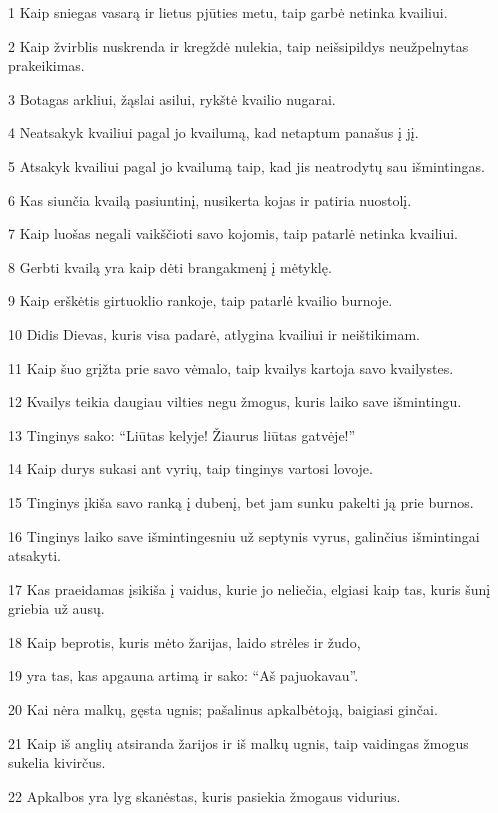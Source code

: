 \par 1 Kaip sniegas vasarą ir lietus pjūties metu, taip garbė netinka kvailiui. 
\par 2 Kaip žvirblis nuskrenda ir kregždė nulekia, taip neišsipildys neužpelnytas prakeikimas. 
\par 3 Botagas arkliui, žąslai asilui, rykštė kvailio nugarai. 
\par 4 Neatsakyk kvailiui pagal jo kvailumą, kad netaptum panašus į jį. 
\par 5 Atsakyk kvailiui pagal jo kvailumą taip, kad jis neatrodytų sau išmintingas. 
\par 6 Kas siunčia kvailą pasiuntinį, nusikerta kojas ir patiria nuostolį. 
\par 7 Kaip luošas negali vaikščioti savo kojomis, taip patarlė netinka kvailiui. 
\par 8 Gerbti kvailą yra kaip dėti brangakmenį į mėtyklę. 
\par 9 Kaip erškėtis girtuoklio rankoje, taip patarlė kvailio burnoje. 
\par 10 Didis Dievas, kuris visa padarė, atlygina kvailiui ir neištikimam. 
\par 11 Kaip šuo grįžta prie savo vėmalo, taip kvailys kartoja savo kvailystes. 
\par 12 Kvailys teikia daugiau vilties negu žmogus, kuris laiko save išmintingu. 
\par 13 Tinginys sako: “Liūtas kelyje! Žiaurus liūtas gatvėje!” 
\par 14 Kaip durys sukasi ant vyrių, taip tinginys vartosi lovoje. 
\par 15 Tinginys įkiša savo ranką į dubenį, bet jam sunku pakelti ją prie burnos. 
\par 16 Tinginys laiko save išmintingesniu už septynis vyrus, galinčius išmintingai atsakyti. 
\par 17 Kas praeidamas įsikiša į vaidus, kurie jo neliečia, elgiasi kaip tas, kuris šunį griebia už ausų. 
\par 18 Kaip beprotis, kuris mėto žarijas, laido strėles ir žudo, 
\par 19 yra tas, kas apgauna artimą ir sako: “Aš pajuokavau”. 
\par 20 Kai nėra malkų, gęsta ugnis; pašalinus apkalbėtoją, baigiasi ginčai. 
\par 21 Kaip iš anglių atsiranda žarijos ir iš malkų ugnis, taip vaidingas žmogus sukelia kivirčus. 
\par 22 Apkalbos yra lyg skanėstas, kuris pasiekia žmogaus vidurius. 

